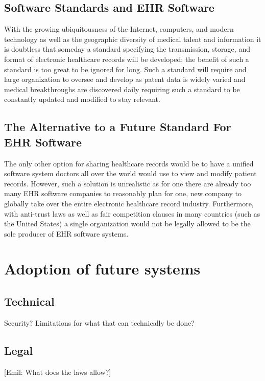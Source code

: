 \documentclass[14pt]{article}
\begin{document}
\subsection{Software Standards and EHR Software}
With the growing ubiquitousness of the Internet, computers, and modern technology as well as the geographic diversity of medical talent and information it is doubtless that someday a standard specifying the transmission, storage, and format of electronic healthcare records will be developed; the benefit of such a standard is too great to be ignored for long. Such a standard will require and large organization to oversee and develop as patent data is widely varied and medical breakthroughs are discovered daily requiring such a standard to be constantly updated and modified to stay relevant. 

\subsection{The Alternative to a Future Standard For EHR Software}
The only other option for sharing healthcare records would be to have a unified software system doctors all over the world would use to view and modify patient records. However, such a solution is unrealistic as for one there are already too many \gls{EHR} software companies to reasonably plan for one, new company to globally take over the entire electronic healthcare record industry. Furthermore, with anti-trust laws as well as fair competition clauses in many countries (such as the United States) a single organization would not be legally allowed to be the sole producer of \gls{EHR} software systems.

\newpage

\section{Adoption of future systems}


\subsection{Technical}
Security? Limitations for what that can technically be done?


\subsection{Legal}
[Emil: What does the laws allow?]
\end{document}
